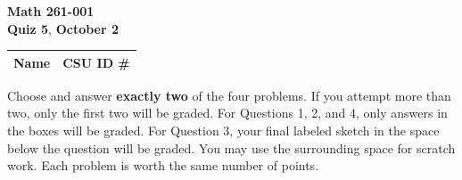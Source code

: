 \documentclass[12pt]{exam}
\newcommand{\class}{Math 261-001}
\newcommand{\examnum}{Quiz 5}
\newcommand{\examdate}{October 2}
\begin{document}
\pagestyle{plain}
\thispagestyle{empty}

\noindent
\textbf{\class}\\
\textbf{\examnum}, \textbf{\examdate}

\setlength{\tabcolsep}{3.5cm}
\renewcommand{\arraystretch}{1.5}
\setlength\extrarowheight{1cm}
\begin{tabular}{ |c|c| }
 \hline
 Name   & CSU ID \#  \\
 \hline
\end{tabular}

\vspace{10pt}

Choose and answer \textbf{exactly two} of the four problems. If you attempt
more than two, only the first two will be graded. For Questions 1, 2, and 4,
only answers in the boxes will be graded. For Question 3, your final labeled
sketch in the space below the question will be graded. You may use the
surrounding space for scratch work. Each problem is worth the same number
of points.
\end{document}
